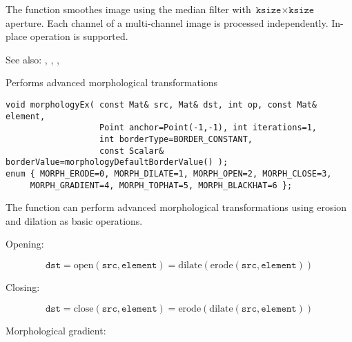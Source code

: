 The function smoothes image using the median filter with $\texttt{ksize} \times \texttt{ksize}$ aperture. Each channel of a multi-channel image is processed independently. In-place operation is supported.

See also: , , , 

Performs advanced morphological transformations

\begin{lstlisting}
void morphologyEx( const Mat& src, Mat& dst, int op, const Mat& element,
                   Point anchor=Point(-1,-1), int iterations=1,
                   int borderType=BORDER_CONSTANT,
                   const Scalar& borderValue=morphologyDefaultBorderValue() );
enum { MORPH_ERODE=0, MORPH_DILATE=1, MORPH_OPEN=2, MORPH_CLOSE=3,
     MORPH_GRADIENT=4, MORPH_TOPHAT=5, MORPH_BLACKHAT=6 };
\end{lstlisting}
\begin{description}
\end{description}

The function can perform advanced morphological transformations using erosion and dilation as basic operations.

Opening:

\[
\texttt{dst}=\mathrm{open}(\texttt{src},\texttt{element})=\mathrm{dilate}(\mathrm{erode}(\texttt{src},\texttt{element}))
\]

Closing:

\[
\texttt{dst}=\mathrm{close}(\texttt{src},\texttt{element})=\mathrm{erode}(\mathrm{dilate}(\texttt{src},\texttt{element}))
\]

Morphological gradient:


